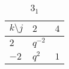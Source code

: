 \begin{table}[h]
\centering
\begin{tabular}{l|ll}
$k \setminus j$ & $2$ & $4$ \\
\hline
$2$ & $q^{-2}$ &  \\
$-2$ & $q^{2}$ & $1$ \\
\end{tabular}
\caption*{$3_1$}
\end{table}